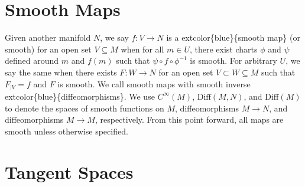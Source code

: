 \documentclass[
]{book}
\begin{document}
\hypertarget{smooth-maps}{%
\section{Smooth Maps}\label{smooth-maps}}

Given another manifold \(N\), we say \(f : V \to N\) is a extcolor\{blue\}\{smooth map\} (or smooth) for an open set \(V \subseteq M\) when for all \(m \in U\), there exist charts \(\phi\) and \(\psi\) defined around \(m\) and \(f(m)\) such that \(\psi \circ f \circ \phi^{-1}\) is smooth. For arbitrary \(U\), we say the same when there exists \(F : W \to N\) for an open set \(V \subset W \subseteq M\) such that \(F_{|V} = f\) and \(F\) is smooth. We call smooth maps with smooth inverse extcolor\{blue\}\{diffeomorphisms\}. We use \(C^\infty(M)\), \(\text{Diff}(M,N)\), and \(\text{Diff}(M)\) to denote the spaces of smooth functions on \(M\), diffeomorphisms \(M \to N\), and diffeomorphisms \(M \to M\), respectively. From this point forward, all maps are smooth unless otherwise specified.

\hypertarget{tangent-spaces}{%
\section{Tangent Spaces}\label{tangent-spaces}}
\end{document}
